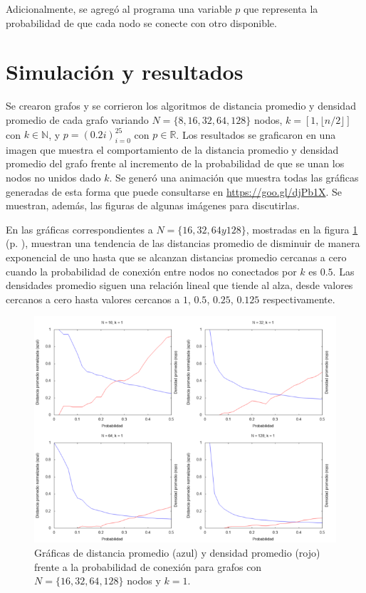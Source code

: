 \documentclass{article}
\begin{document}
  Adicionalmente, se agregó al programa una variable $p$ que representa la probabilidad de que cada nodo se conecte con otro disponible.

  \section{Simulación y resultados}

  Se crearon grafos y se corrieron los algoritmos de distancia promedio y densidad promedio de cada grafo variando $N = \{ 8, 16, 32, 64, 128 \}$ nodos, $k = [1, \lfloor n / 2 \rfloor]$ con $k \in \mathbb{N}$, y $p = (0.2i)_{i= 0}^{25}$ con $p \in \mathbb{R}$. Los resultados se graficaron en una imagen que muestra el comportamiento de la distancia promedio y densidad promedio del grafo frente al incremento de la probabilidad de que se unan los nodos no unidos dado $k$. Se generó una animación que muestra todas las gráficas generadas de esta forma que puede consultarse en \url{https://goo.gl/djPb1X}. Se muestran, además, las figuras de algunas imágenes para discutirlas.

  En las gráficas correspondientes a $N = \{ 16, 32, 64 y 128 \} $, mostradas en la figura \ref{ejemplok1} (p. \pageref{ejemplok1}), muestran una tendencia de las distancias promedio de disminuir de manera exponencial de uno hasta que se alcanzan distancias promedio cercanas a cero cuando la probabilidad de conexión entre nodos no conectados por $k$ es $0.5$. Las densidades promedio siguen una relación lineal que tiende al alza, desde valores cercanos a cero hasta valores cercanos a $1$, $0.5$, $0.25$, $0.125$ respectivamente.

  \begin{figure}[h]
    \includegraphics[width=1\textwidth]{ejemplok1}
    \centering
    \caption{Gráficas de distancia promedio (azul) y densidad promedio (rojo) frente a la probabilidad de conexión para grafos con $N = \{ 16, 32, 64, 128 \} $ nodos y $k = 1$.}
    \label{ejemplok1}
  \end{figure}
\end{document}
